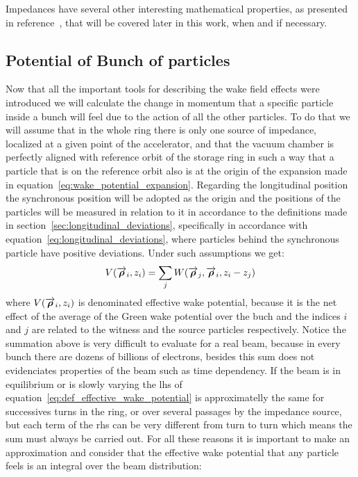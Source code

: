 \documentclass[
	12pt,				%
	openright,			%
	oneside,			%
	a4paper,		%
	chapter=TITLE,		%
	section=TITLE,		%
    brazil,				%
	english,			%
	sumario=tradicional,
	]{abntex2}
\begin{document}
  Impedances have several other interesting mathematical properties, as presented in reference~\cite{CHao1993}, that will be covered later in this work, when and if necessary.

  \subsection{Potential of Bunch of particles}

  Now that all the important tools for describing the wake field effects were introduced we will calculate the change in momentum that a specific particle inside a bunch will feel due to the action of all the other particles. To do that we will assume that in the whole ring there is only one source of impedance, localized at a given point of the accelerator, and that the vacuum chamber is perfectly aligned with reference orbit of the storage ring in such a way that a particle that is on the reference orbit also is at the origin of the expansion made in equation~\eqref{eq:wake_potential_expansion}. Regarding the longitudinal position the synchronous position will be adopted as the origin and the positions of the particles will be measured in relation to it in accordance to the definitions made in section~\ref{sec:longitudinal_deviations}, specifically in accordance with equation~\ref{eq:longitudinal_deviations}, where particles behind the synchronous particle have positive deviations. Under such assumptions we get:
  \begin{align}\label{eq:def_effective_wake_potential}
  	  V(\overrightarrow{\boldsymbol{\rho}}_i, z_i) = \sum_j W(\overrightarrow{\boldsymbol{\rho}}_j,\overrightarrow{\boldsymbol{\rho}}_i,z_i-z_j)
  \end{align}
  where $V(\overrightarrow{\boldsymbol{\rho}}_i, z_i)$ is denominated effective wake potential, because it is the net effect of the average of the Green wake potential over the buch and the indices $i$ and $j$ are related to the witness and the source particles respectively. Notice the summation above is very difficult to evaluate for a real beam, because in every bunch there are dozens of billions of electrons, besides this sum does not evidenciates properties of the beam such as time dependency. If the beam is in equilibrium or is slowly varying the \gls{lhs} of equation~\ref{eq:def_effective_wake_potential} is approximatelly the same for successives turns in the ring, or over several passages by the impedance source, but each term of the \gls{rhs} can be very different from turn to turn which means the sum must always be carried out. For all these reasons it is important to make an approximation and consider that the effective wake potential that any particle feels is an integral over the beam distribution:
\end{document}
